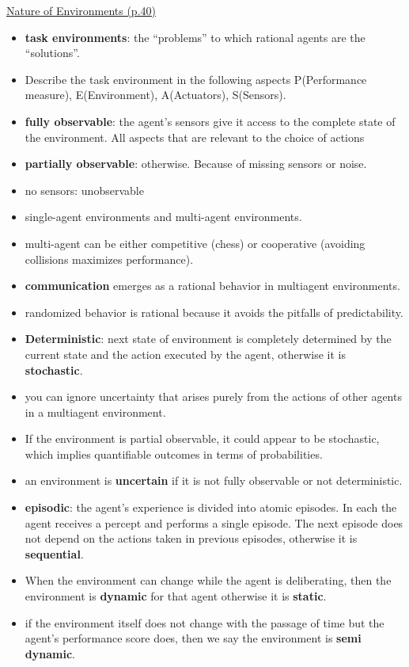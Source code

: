 \underline{Nature of Environments (p.40)}
\begin{itemize}[noitemsep,nolistsep]
	\item \textbf{task environments}: the “problems” to which rational agents are the “solutions”.
	\item Describe the task environment in the following aspects P(Performance measure), E(Environment), A(Actuators), S(Sensors).
	\item \textbf{fully observable}: the agent’s sensors give it access to the complete state of the environment. All aspects that are relevant to the choice of actions
	\item \textbf{partially observable}: otherwise. Because of missing sensors or noise.
	\item no sensors: unobservable
	\item single-agent environments and multi-agent environments.
	\item multi-agent can be either competitive (chess) or cooperative (avoiding collisions maximizes performance).
	\item \textbf{communication} emerges as a rational behavior in multiagent environments.
	\item randomized behavior is rational because it avoids the pitfalls of predictability.
	\item \textbf{Deterministic}: next state of environment is completely determined by the current state and the action executed by the agent, otherwise it is \textbf{stochastic}.
	\item you can ignore uncertainty that arises purely from the actions of other agents in a multiagent environment.
	\item If the environment is partial observable, it could appear to be stochastic, which implies quantifiable outcomes in terms of probabilities.
	\item an environment is \textbf{uncertain} if it is not fully observable or not deterministic. 
	\item \textbf{episodic}: the agent’s experience is divided into atomic episodes. In each the agent receives a percept and performs a single episode. The next episode does not depend on the actions taken in previous episodes, otherwise it is \textbf{sequential}.
	\item When the environment can change while the agent is deliberating, then the environment is \textbf{dynamic} for that agent otherwise it is \textbf{static}.
	\item if the environment itself does not change with the passage of time but the agent’s performance score does, then we say the environment is \textbf{semi dynamic}.

\end{itemize}
